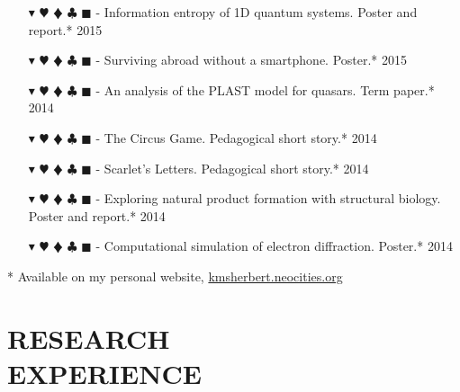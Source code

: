 \documentclass[overlapped, 10pt]{res} %
\newcommand{\physics}{$\blacktriangledown$}
\newcommand{\biochem}{$\varheartsuit$}
\newcommand{\shannon}{$\vardiamondsuit$}
\newcommand{\classic}{$\clubsuit$}
\newcommand{\quantum}{$\blacksquare$}
\newcommand{\physicscolor}{\color{YellowOrange}}
\newcommand{\biochemcolor}{\color{Emerald}}
\newcommand{\shannoncolor}{\color{Goldenrod}}
\newcommand{\classiccolor}{\color{Cyan}}
\newcommand{\quantumcolor}{\color{RedOrange}}
\newcommand{\tag}[1]{
    {\IfSubStr{#1}{\physics}{\physicscolor}{\color{White}}\physics}
    {\IfSubStr{#1}{\biochem}{\biochemcolor}{\color{White}}\biochem}
    {\IfSubStr{#1}{\shannon}{\shannoncolor}{\color{White}}\shannon}
    {\IfSubStr{#1}{\classic}{\classiccolor}{\color{White}}\classic}
    {\IfSubStr{#1}{\quantum}{\quantumcolor}{\color{White}}\quantum}
}
\begin{document}
\begin{resume}
\begin{itemize}
\item[\tag{\physics\shannon\classic}-] Information entropy of 1D quantum systems.
    \hfill Poster and report.* 2015
\item[\tag{}-] Surviving abroad without a smartphone.
    \hfill Poster.* 2015
\item[\tag{\physics}-] An analysis of the PLAST model for quasars.
    \hfill Term paper.* 2014
\item[\tag{\shannon}-] The Circus Game.
    \hfill Pedagogical short story.* 2014
\item[\tag{\physics}-] Scarlet's Letters.
    \hfill Pedagogical short story.* 2014
\item[\tag{\biochem}-] Exploring natural product formation with structural biology.
    \hfill Poster and report.* 2014
\item[\tag{\physics\classic}-] Computational simulation of electron diffraction.
    \hfill Poster.* 2014
\end{itemize}

* Available on my personal website, \href{kmsherbert.neocities.org}{kmsherbert.neocities.org}


\section{RESEARCH\\EXPERIENCE}


\end{resume}
\end{document}
